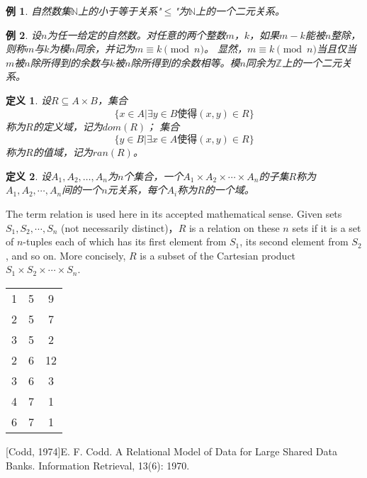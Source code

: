 \documentclass{article}
\newtheorem{Def}{定义}
\newtheorem{Example}{例}
\begin{document}
\begin{CJK*}{UTF8}{gbsn}
  \begin{Example}
    自然数集$\mathbb{N}$上的小于等于关系"$\leq$"为$\mathbb{N}$上的一个二元关系。
  \end{Example}
  \begin{Example}
    设$n$为任一给定的自然数。对任意的两个整数$m$，$k$，如果$m-k$能被$n$整除，则称$m$与$k$为模$n$同余，并记为$m\equiv k \pmod{n}$。
    显然，$m\equiv k \pmod{n}$当且仅当$m$被$n$除所得到的余数与$k$被$n$除所得到的余数相等。模$n$同余为$\mathbb{Z}$上的一个二元关系。
  \end{Example}

    \begin{Def}
    设$R \subseteq A \times B$，集合
    \[\{x \in A | \exists y \in B \text{使得} (x,y) \in R\}\]
    称为$R$的定义域，记为$dom(R)$； 集合
    \[\{y \in B | \exists x \in A \text{使得} (x,y) \in R\}\]
    称为$R$的值域，记为$ran(R)$。
  \end{Def}

    \begin{Def}
    设$A_1, A_2, \ldots, A_n$为$n$个集合，一个$A_1\times A_2 \times \cdots \times A_n$的子集$R$称为$A_1, A_2, \cdots, A_n$间的一个$n$元关系，每个$A_i$称为$R$的一个域。
  \end{Def}

    The term relation is used here in its accepted mathematical sense. Given sets $S_1, S_2, \cdots, S_n$ (not necessarily distinct)，$R$ is a relation on these $n$ sets if it is a set of $n$-tuples each of which has its first element from $S_1$, its second element from $S_2$, and so on. More concisely, $R$ is a subset of the Cartesian product $S_1 \times S_2 \times \cdots \times S_n$.

  \begin{tabular}{ccc}
1& 5& 9\\
    2& 5&7 \\
    3& 5&2 \\
2&6 &12 \\
3&6 &3 \\
    4&7 &1 \\
    6&7 &1 \\
  \end{tabular}

[Codd, 1974]E. F. Codd. A Relational Model of Data for Large Shared Data Banks.
Information Retrieval, 13(6): 1970.



\end{CJK*}
\end{document}
